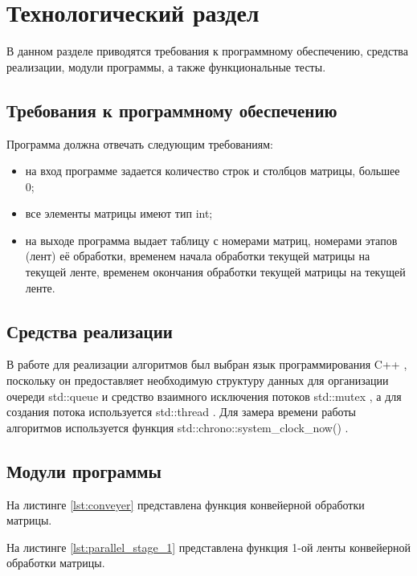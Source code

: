 \chapter{Технологический раздел}
В данном разделе приводятся требования к программному обеспечению, средства реализации, модули программы, а также функциональные тесты.

\section{Требования к программному обеспечению}
Программа должна отвечать следующим требованиям:
\begin{itemize}
	\item на вход программе задается количество строк и столбцов матрицы, большее 0;
	\item все элементы матрицы имеют тип int;
	\item на выходе программа выдает таблицу с номерами матриц, номерами этапов (лент) её обработки, временем начала обработки текущей матрицы на текущей ленте, временем окончания обработки текущей матрицы на текущей ленте.
\end{itemize}

\section{Средства реализации}
В работе для реализации алгоритмов был выбран язык программирования C++ \cite{c++}, поскольку он предоставляет необходимую структуру данных для организации очереди std::queue \cite{queue} и средство взаимного исключения потоков std::mutex \cite{mutex}, а для создания потока используется std::thread \cite{thread}. Для замера времени работы алгоритмов используется функция std::chrono::system\_clock\_now() \cite{system_clock}.

\section{Модули программы}
На листинге \ref{lst:conveyer} представлена функция конвейерной обработки матрицы.
\newpage


На листинге \ref{lst:parallel_stage_1} представлена функция 1-ой ленты конвейерной обработки матрицы.


